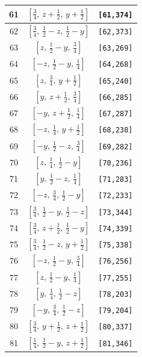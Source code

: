 \documentclass[fleqn,8pt]{jsarticle}
\begin{document}
\begin{longtable}{ccc}
61 & $\left[ \frac{3}{4},\, z + \frac{1}{2},\, y + \frac{1}{2} \right]$ & {\tt [61,374]} \\ \hline
62 & $\left[ \frac{3}{4},\, \frac{1}{2} - z,\, \frac{1}{2} - y \right]$ & {\tt [62,373]} \\ \hline
63 & $\left[ z,\, \frac{1}{2} - y,\, \frac{3}{4} \right]$ & {\tt [63,269]} \\ \hline
64 & $\left[ - z,\, \frac{1}{2} - y,\, \frac{1}{4} \right]$ & {\tt [64,268]} \\ \hline
65 & $\left[ z,\, \frac{3}{4},\, y + \frac{1}{2} \right]$ & {\tt [65,240]} \\ \hline
66 & $\left[ y,\, z + \frac{1}{2},\, \frac{3}{4} \right]$ & {\tt [66,285]} \\ \hline
67 & $\left[ - y,\, z + \frac{1}{2},\, \frac{1}{4} \right]$ & {\tt [67,287]} \\ \hline
68 & $\left[ - z,\, \frac{1}{4},\, y + \frac{1}{2} \right]$ & {\tt [68,238]} \\ \hline
69 & $\left[ - y,\, \frac{1}{2} - z,\, \frac{3}{4} \right]$ & {\tt [69,282]} \\ \hline
70 & $\left[ z,\, \frac{1}{4},\, \frac{1}{2} - y \right]$ & {\tt [70,236]} \\ \hline
71 & $\left[ y,\, \frac{1}{2} - z,\, \frac{1}{4} \right]$ & {\tt [71,283]} \\ \hline
72 & $\left[ - z,\, \frac{3}{4},\, \frac{1}{2} - y \right]$ & {\tt [72,233]} \\ \hline
73 & $\left[ \frac{3}{4},\, \frac{1}{2} - y,\, \frac{1}{2} - z \right]$ & {\tt [73,344]} \\ \hline
74 & $\left[ \frac{3}{4},\, z + \frac{1}{2},\, \frac{1}{2} - y \right]$ & {\tt [74,339]} \\ \hline
75 & $\left[ \frac{3}{4},\, \frac{1}{2} - z,\, y + \frac{1}{2} \right]$ & {\tt [75,338]} \\ \hline
76 & $\left[ - z,\, \frac{1}{2} - y,\, \frac{3}{4} \right]$ & {\tt [76,256]} \\ \hline
77 & $\left[ z,\, \frac{1}{2} - y,\, \frac{1}{4} \right]$ & {\tt [77,255]} \\ \hline
78 & $\left[ y,\, \frac{1}{4},\, \frac{1}{2} - z \right]$ & {\tt [78,203]} \\ \hline
79 & $\left[ - y,\, \frac{3}{4},\, \frac{1}{2} - z \right]$ & {\tt [79,204]} \\ \hline
80 & $\left[ \frac{3}{4},\, y + \frac{1}{2},\, z + \frac{1}{2} \right]$ & {\tt [80,337]} \\ \hline
81 & $\left[ \frac{1}{4},\, \frac{1}{2} - y,\, z + \frac{1}{2} \right]$ & {\tt [81,346]} \\ \hline

\end{longtable}
\end{document}
